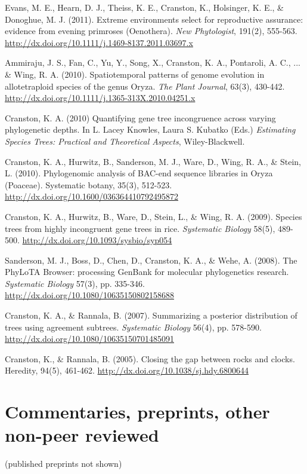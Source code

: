 \documentclass[10pt]{article}
\begin{document}
Evans, M. E., Hearn, D. J., Theiss, K. E., Cranston, K., Holsinger, K. E., \& Donoghue, M. J. (2011). Extreme environments select for reproductive assurance: evidence from evening primroses (Oenothera). \textit{New Phytologist}, 191(2), 555-563. \url{http://dx.doi.org/10.1111/j.1469-8137.2011.03697.x} 

Ammiraju, J. S., Fan, C., Yu, Y., Song, X., Cranston, K. A., Pontaroli, A. C., ... \& Wing, R. A. (2010). Spatiotemporal patterns of genome evolution in allotetraploid species of the genus Oryza. \textit{The Plant Journal}, 63(3), 430-442. \url{http://dx.doi.org/10.1111/j.1365-313X.2010.04251.x} 

Cranston, K. A. (2010) Quantifying gene tree incongruence across varying phylogenetic depths. In L. Lacey Knowles, Laura S. Kubatko (Eds.) \textit{Estimating Species Trees: Practical and Theoretical Aspects}, Wiley-Blackwell.

Cranston, K. A., Hurwitz, B., Sanderson, M. J., Ware, D., Wing, R. A., \& Stein, L. (2010). Phylogenomic analysis of BAC-end sequence libraries in Oryza (Poaceae). Systematic botany, 35(3), 512-523. \url{http://dx.doi.org/10.1600/036364410792495872} 

Cranston, K. A., Hurwitz, B., Ware, D., Stein, L., \& Wing, R. A. (2009). Species trees from highly incongruent gene trees in rice.  \textit{Systematic Biology} 58(5), 489-500. \url{http://dx.doi.org/10.1093/sysbio/syp054} 

Sanderson, M. J., Boss, D., Chen, D., Cranston, K. A., \& Wehe, A. (2008). The PhyLoTA Browser: processing GenBank for molecular phylogenetics research. \textit{Systematic Biology} 57(3), pp. 335-346. \url{http://dx.doi.org/10.1080/10635150802158688} 

Cranston, K. A., \& Rannala, B. (2007). Summarizing a posterior distribution of trees using agreement subtrees. \textit{Systematic Biology} 56(4), pp. 578-590. \\
\url{http://dx.doi.org/10.1080/10635150701485091} 

Cranston, K., \& Rannala, B. (2005). Closing the gap between rocks and clocks. Heredity, 94(5), 461-462. \url{http://dx.doi.org/10.1038/sj.hdy.6800644}

\section*{Commentaries, preprints, other non-peer reviewed}

(published preprints not shown)
\end{document}
